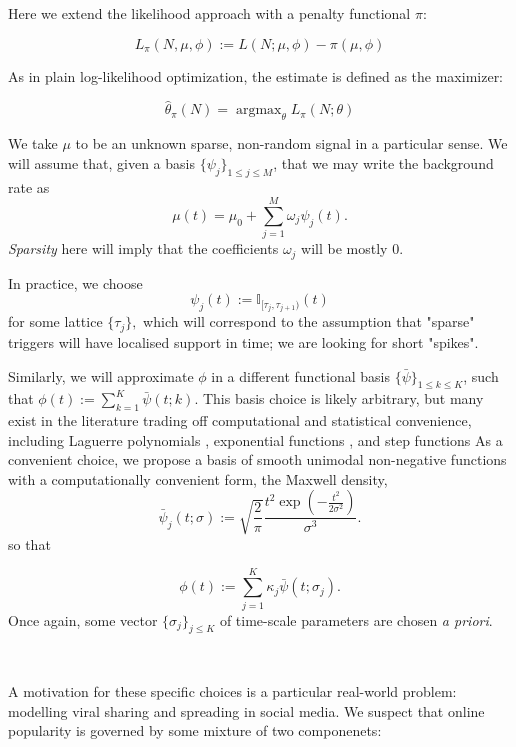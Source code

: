 \documentclass[11pt]{article}
\newcommand{\bb}[1]{\mathbb{#1}}
\newcommand{\oo}[1]{\operatorname{#1}}
\begin{document}
    Here we extend the likelihood approach with a penalty functional
\(\pi\):

\[L_\pi(N, \mu, \phi):= L(N; \mu, \phi)- \pi(\mu, \phi)\]

As in plain log-likelihood optimization, the estimate is defined as the
maximizer:

\[\hat{\theta}_\pi(N) = \oo{argmax}_\theta L_\pi(N;\theta)\]

    We take \(\mu\) to be an unknown sparse, non-random signal in a
particular sense. We will assume that, given a basis
\(\{\psi_j \}_{1\leq j\leq M}\), that we may write the background rate
as \[\mu(t) = \mu_0 + \sum_{j=1}^M  \omega_j \psi_j(t).\]
\emph{Sparsity} here will imply that the coefficients \(\omega_j\) will
be mostly 0.

In practice, we choose
\[\psi_j(t) := \bb{I}_{[\tau_{j},\tau_{j+1})}(t)\] for some lattice
\(\{\tau_j\},\) which will correspond to the assumption that "sparse"
triggers will have localised support in time; we are looking for short
"spikes".

Similarly, we will approximate \(\phi\) in a different functional basis
\(\{\bar{\psi}\}_{1\leq k \leq K}\), such that
\(\phi(t):= \sum_{k=1}^K \bar{\psi}(t;k)\). This basis choice is likely
arbitrary, but many exist in the literature trading off computational
and statistical convenience, including Laguerre polynomials
\cite{ogata_linear_1982}, exponential functions
\cite{schoenberg_consistent_2005,rambaldi_modeling_2015}, and step
functions \cite{eichler_graphical_2016} As a convenient choice, we
propose a basis of smooth unimodal non-negative functions with a
computationally convenient form, the Maxwell density,
\[\bar{\psi}_j(t;\sigma):=\sqrt{\frac{2}{\pi}} \frac{t^2\exp\left(-\frac{t^2}{2\sigma^2}\right)}{\sigma^3}.\]
so that

\[\phi(t):= \sum_{j=1}^K \kappa_j\bar{\psi}(t;\sigma_j).\] Once again,
some vector \(\{\sigma_j\}_{j\leq K}\) of time-scale parameters are
chosen \emph{a priori}.



    \begin{center}
    \end{center}
    { \hspace*{\fill} \\}
    
    A motivation for these specific choices is a particular real-world
problem: modelling viral sharing and spreading in social media. We
suspect that online popularity is governed by some mixture of two
componenets:
\end{document}
